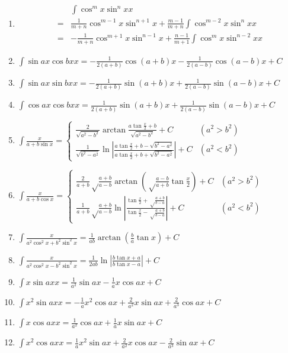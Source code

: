 \documentclass{book}
\begin{document}
\begin{enumerate}
\item \[ \begin{split} {} & \int \cos^m x \sin^n x  x \\
	= & \frac{1}{m+n} \cos^{m-1} x \sin^{n+1}x + \frac{m-1}{m+n}\int\cos^{m-2}x\sin^nx x \\
	= & -\frac{1}{m+n} \cos^{m+1} x \sin^{n-1}x + \frac{n-1}{m+1} \int \cos^m x\sin^{n-2} x  x \end{split} \]

\item $ \int \sin ax \cos bx  x = -\frac{1}{2(a+b)}\cos(a+b)x - \frac{1}{2(a-b)}\cos(a-b)x + C $

\item $ \int \sin ax \sin bx  x = -\frac{1}{2(a+b)}\sin(a+b)x + \frac{1}{2(a-b)}\sin(a-b)x + C $

\item $ \int \cos ax \cos bx  x =  \frac{1}{2(a+b)}\sin(a+b)x + \frac{1}{2(a-b)}\sin(a-b)x + C $

\item $ \int \frac{ x}{a + b \sin x} = \begin{cases}
\frac{2}{\sqrt{a^2-b^2}}\arctan\frac{a\tan\frac{x}{2}+b}{\sqrt{a^2-b^2}} + C & (a^2 > b^2) \\
\frac{1}{\sqrt{b^2-a^2}}\ln \left| \frac{a\tan\frac{x}{2}+b-\sqrt{b^2-a^2}}{a\tan\frac{x}{2}+b+\sqrt{b^2-a^2}} \right| + C & (a^2 < b^2)
\end{cases} $

\item $ \int \frac{ x}{a + b \cos x} = \begin{cases}
\frac{2}{a+b}\sqrt\frac{a+b}{a-b} \arctan\left(\sqrt\frac{a-b}{a+b}\tan\frac{x}{2}\right) + C & (a^2 > b^2) \\
\frac{1}{a+b}\sqrt\frac{a+b}{a-b} \ln \left| \frac{\tan\frac{x}{2}+\sqrt\frac{a+b}{b-a}}{\tan\frac{x}{2}-\sqrt\frac{a+b}{b-a}} \right| + C
& (a^2 < b^2)
\end{cases} $

\item $ \int \frac{ x}{a^2\cos^2x+b^2\sin^2x} = \frac{1}{ab} \arctan\left( \frac{b}{a}\tan x \right) + C $

\item $ \int \frac{ x}{a^2\cos^2x-b^2\sin^2x} = \frac{1}{2ab}\ln\left|\frac{b\tan x+a}{b\tan x-a}\right| + C $

\item $ \int x \sin ax  x = \frac{1}{a^2} \sin ax - \frac{1}{a} x \cos ax + C $

\item $ \int x^2 \sin ax  x = -\frac{1}{a} x^2 \cos ax + \frac{2}{a^2} x \sin ax + \frac{2}{a^3} \cos ax + C$

\item $ \int x \cos ax  x = \frac{1}{a^2} \cos ax + \frac{1}{a} x \sin ax + C $

\item $ \int x^2 \cos ax  x = \frac{1}{a} x^2 \sin ax + \frac{2}{a^2} x \cos ax - \frac{2}{a^3} \sin ax + C $

\end{enumerate}
\end{document}
